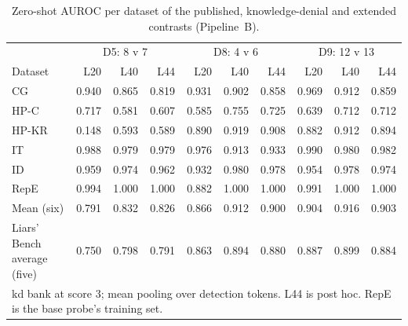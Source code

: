 \begin{table}[t]
\centering
\footnotesize
\caption{Zero-shot AUROC per dataset of the published, knowledge-denial and extended contrasts (Pipeline~B).}
\label{tab:r-zeroshot}
\begin{tabular}{lrrrrrrrrr}
\hline
 & \multicolumn{3}{c}{D5: 8 v 7} & \multicolumn{3}{c}{D8: 4 v 6} & \multicolumn{3}{c}{D9: 12 v 13} \\
Dataset & L20 & L40 & L44 & L20 & L40 & L44 & L20 & L40 & L44 \\
\hline
CG & 0.940 & 0.865 & 0.819 & 0.931 & 0.902 & 0.858 & 0.969 & 0.912 & 0.859 \\
HP-C & 0.717 & 0.581 & 0.607 & 0.585 & 0.755 & 0.725 & 0.639 & 0.712 & 0.712 \\
HP-KR & 0.148 & 0.593 & 0.589 & 0.890 & 0.919 & 0.908 & 0.882 & 0.912 & 0.894 \\
IT & 0.988 & 0.979 & 0.979 & 0.976 & 0.913 & 0.933 & 0.990 & 0.980 & 0.982 \\
ID & 0.959 & 0.974 & 0.962 & 0.932 & 0.980 & 0.978 & 0.954 & 0.978 & 0.974 \\
RepE & 0.994 & 1.000 & 1.000 & 0.882 & 1.000 & 1.000 & 0.991 & 1.000 & 1.000 \\
\hline
Mean (six) & 0.791 & 0.832 & 0.826 & 0.866 & 0.912 & 0.900 & 0.904 & 0.916 & 0.903 \\
Liars' Bench average (five) & 0.750 & 0.798 & 0.791 & 0.863 & 0.894 & 0.880 & 0.887 & 0.899 & 0.884 \\
\hline
\multicolumn{10}{l}{\scriptsize kd bank at score 3; mean pooling over detection tokens. L44 is post hoc. RepE is the base probe's training set.} \\
\end{tabular}
\end{table}

